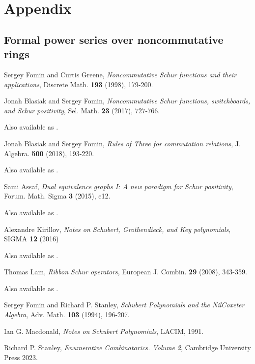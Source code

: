 \documentclass{article}
\begin{document}
\section{Appendix}

\subsection{Formal power series over noncommutative rings}

\begin{thebibliography}{999999}
    \raggedright\footnotesize

    Sergey Fomin and Curtis Greene, 
    \textit{Noncommutative Schur functions and their applications}, 
    Discrete Math. \textbf{193} (1998), 179-200.

    Jonah Blasiak and Sergey Fomin, 
    \textit{Noncommutative Schur functions, switchboards, and Schur positivity},
    Sel. Math. \textbf{23} (2017), 727-766.

    Also available as .

    Jonah Blasiak and Sergey Fomin, 
    \textit{Rules of Three for commutation relations},
    J. Algebra. \textbf{500} (2018), 193-220.

    Also available as .

    Sami Assaf,
    \textit{Dual equivalence graphs I: A new paradigm for Schur positivity},
    Forum. Math. Sigma \textbf{3} (2015), e12.

    Also available as .

    Alexandre Kirillov,
    \textit{Notes on Schubert, Grothendieck, and Key polynomials},
    SIGMA \textbf{12} (2016)

    Also available as .

    Thomas Lam,
    \textit{Ribbon Schur operators},
    European J. Combin. \textbf{29} (2008), 343-359.

    Also available as .

    Sergey Fomin and Richard P. Stanley, 
    \textit{Schubert Polynomials and the NilCoxeter Algebra},
    Adv. Math. \textbf{103} (1994), 196-207.

    Ian G. Macdonald, 
    \textit{Notes on Schubert Polynomials}, 
    LACIM, 1991.

    Richard P. Stanley, 
    \textit{Enumerative Combinatorics. Volume 2}, 
    Cambridge University Press 2023.

\end{thebibliography}
\end{document}
